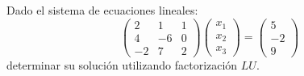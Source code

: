 \documentclass[a4,11pt]{aleph-notas}
\begin{document}
\begin{ejer}
    Dado el sistema de ecuaciones lineales:
    \[
        \begin{pmatrix}
             2 &  1 & 1\\
             4 & -6 & 0\\
            -2 &  7 & 2
        \end{pmatrix}
        \begin{pmatrix}
            x_1 \\ x_2 \\ x_3
        \end{pmatrix}
        =
        \begin{pmatrix}
            5 \\ -2 \\ 9
        \end{pmatrix}
    \]
    determinar su solución utilizando factorización $LU$.
\end{ejer}
\end{document}
